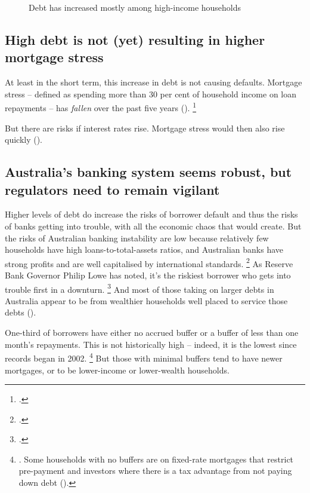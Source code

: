 \begin{figure}
\caption{Debt has increased mostly among high-income households}\label{fig:debt-by-quintile-time}
\end{figure}

\subsection{High debt is not (yet) resulting in higher mortgage stress}\label{subsec:high-debt-is-not-yet-resulting-in-higher-mortgage-stress}

At least in the short term, this increase in debt is not causing defaults.
Mortgage stress -- defined as spending more than 30 per cent of household income on loan repayments -- has \emph{fallen} over the past five years ().%
	\footcite{Mather2017census2016}

But there are risks if interest rates rise.
Mortgage stress would then also rise quickly ().

\subsection{Australia's banking system seems robust, but regulators need to remain vigilant}\label{subsec:australias-banking-system-seems-robust-but-regulators-need-to-remain-vigilant}

Higher levels of debt do increase the risks of borrower default and thus the risks of banks getting into trouble, with all the economic chaos that would create.
But the risks of Australian banking instability are low because relatively few households have high loans-to-total-assets ratios, and Australian banks have strong profits and are well capitalised by international standards.%
	\footcite{RBAFinancialStabilityOct2017}
As Reserve Bank Governor Philip Lowe has noted, it's the riskiest borrower who gets into trouble first in a downturn.%
	\footcite{Lowe2017Householddebt}
And most of those taking on larger debts in Australia appear to be from wealthier households well placed to service those debts ().

One-third of borrowers have either no accrued buffer or a buffer of less than one month's repayments.
This is not historically high -- indeed, it is the lowest since records began in 2002.%
	\footnote{\textcite[][Box~C]{RBAFinancialStabilityApril2017}.
	Some households with no buffers are on fixed-rate mortgages that restrict pre-payment and investors where there is a tax advantage from not paying down debt (\textcite[][21]{RBAFinancialStabilityOct2017}).}
But those with minimal buffers tend to have newer mortgages, or to be lower-income or lower-wealth households.


